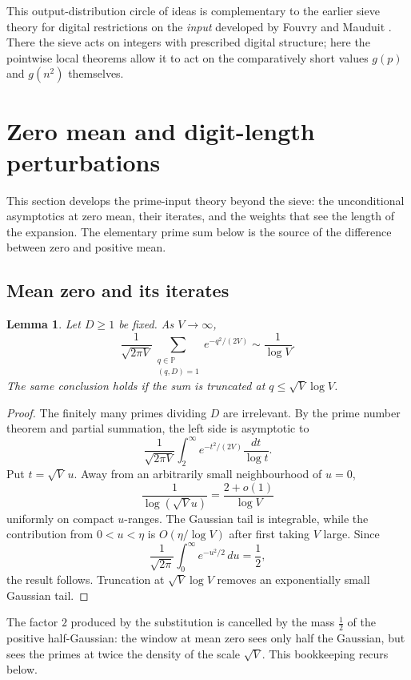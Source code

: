 \documentclass[11pt,reqno]{amsart}
\theoremstyle{plain}
\newtheorem{lemma}[theorem]{Lemma}
\theoremstyle{definition}
\newcommand{\Pp}{\mathbb{P}}
\newcommand{\1}{\mathbf 1}
\begin{document}
This output-distribution circle of ideas is complementary to the earlier sieve theory for digital restrictions on the \emph{input} developed by Fouvry and Mauduit \cite{fouvrymauduit-sieve,fouvrymauduit-almost}.  There the sieve acts on integers with prescribed digital structure; here the pointwise local theorems allow it to act on the comparatively short values $g(p)$ and $g(n^2)$ themselves.

\section{Zero mean and digit-length perturbations}\label{sec:length}

This section develops the prime-input theory beyond the sieve: the unconditional asymptotics at zero mean, their iterates, and the weights that see the length of the expansion.  The elementary prime sum below is the source of the difference between zero and positive mean.

\subsection{Mean zero and its iterates}

\begin{lemma}\label{lem:half-gaussian-primes}
Let $D\ge1$ be fixed.  As $V\to\infty$,
\[
 \frac1{\sqrt{2\pi V}}
 \sum_{\substack{q\in\Pp\\(q,D)=1}}
 e^{-q^2/(2V)}
 \sim \frac1{\log V}.
\]
The same conclusion holds if the sum is truncated at $q\le\sqrt V\log V$.
\end{lemma}

\begin{proof}
The finitely many primes dividing $D$ are irrelevant.  By the prime number theorem and partial summation, the left side is asymptotic to
\[
 \frac1{\sqrt{2\pi V}}\int_2^\infty
 e^{-t^2/(2V)}\frac{dt}{\log t}.
\]
Put $t=\sqrt V\,u$.  Away from an arbitrarily small neighbourhood of $u=0$,
\[
 \frac1{\log(\sqrt V u)}=\frac{2+o(1)}{\log V}
\]
uniformly on compact $u$-ranges.  The Gaussian tail is integrable, while the contribution from $0<u<\eta$ is $O(\eta/\log V)$ after first taking $V$ large.  Since
\[
 \frac1{\sqrt{2\pi}}\int_0^\infty e^{-u^2/2}\,du=\frac12,
\]
the result follows.  Truncation at $\sqrt V\log V$ removes an exponentially small Gaussian tail.
\end{proof}

The factor $2$ produced by the substitution is cancelled by the mass $\tfrac12$ of the positive half-Gaussian: the window at mean zero sees only half the Gaussian, but sees the primes at twice the density of the scale $\sqrt V$.  This bookkeeping recurs below.
\end{document}

